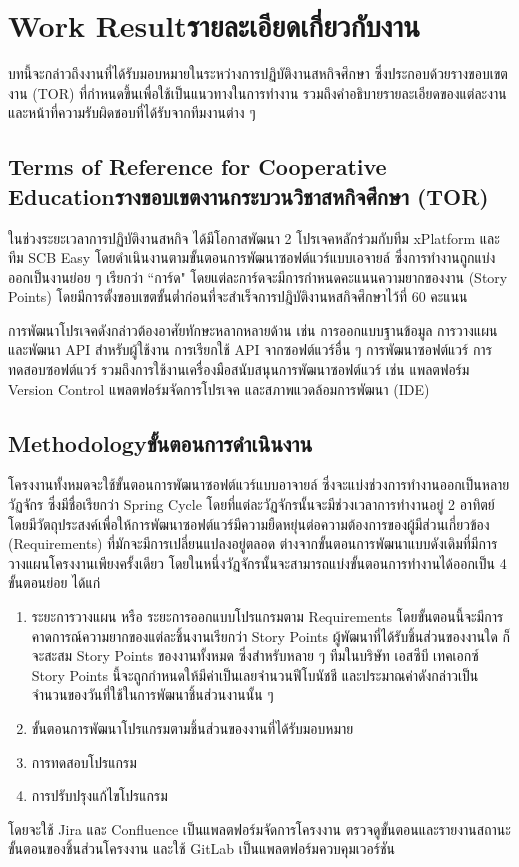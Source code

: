 \chapter{\ifenglish Work Result\else รายละเอียดเกี่ยวกับงาน\fi}
บทนี้จะกล่าวถึงงานที่ได้รับมอบหมายในระหว่างการปฏิบัติงานสหกิจศึกษา ซึ่งประกอบด้วยรางขอบเขตงาน (TOR) ที่กำหนดขึ้นเพื่อใช้เป็นแนวทางในการทำงาน รวมถึงคำอธิบายรายละเอียดของแต่ละงานและหน้าที่ความรับผิดชอบที่ได้รับจากทีมงานต่าง ๆ

\section{\ifenglish Terms of Reference for Cooperative Education\else รางขอบเขตงานกระบวนวิชาสหกิจศึกษา (TOR) \fi}
ในช่วงระยะเวลาการปฏิบัติงานสหกิจ ได้มีโอกาสพัฒนา 2 โปรเจคหลักร่วมกับทีม xPlatform และทีม SCB Easy โดยดำเนินงานตามขั้นตอนการพัฒนาซอฟต์แวร์แบบเอจายล์ ซึ่งการทำงานถูกแบ่งออกเป็นงานย่อย ๆ เรียกว่า ``การ์ด" โดยแต่ละการ์ดจะมีการกำหนดคะแนนความยากของงาน (Story Points) โดยมีการตั้งขอบเขตขั้นต่ำก่อนที่จะสำเร็จการปฎิบัติงานหสกิจศึกษาไว้ที่ 60 คะแนน

การพัฒนาโปรเจคดังกล่าวต้องอาศัยทักษะหลากหลายด้าน เช่น การออกแบบฐานข้อมูล การวางแผนและพัฒนา API สำหรับผู้ใช้งาน การเรียกใช้ API จากซอฟต์แวร์อื่น ๆ การพัฒนาซอฟต์แวร์ การทดสอบซอฟต์แวร์ รวมถึงการใช้งานเครื่องมือสนับสนุนการพัฒนาซอฟต์แวร์ เช่น แพลตฟอร์ม Version Control แพลตฟอร์มจัดการโปรเจค และสภาพแวดล้อมการพัฒนา (IDE)

\section{\ifenglish Methodology\else ขั้นตอนการดำเนินงาน \fi}
โครงงานทั้งหมดจะใช้ขั้นตอนการพัฒนาซอฟต์แวร์แบบอาจายล์ ซึ่งจะแบ่งช่วงการทำงานออกเป็นหลายวัฏจักร ซึ่งมีชื่อเรียกว่า Spring Cycle โดยที่แต่ละวัฏจักรนั้นจะมีช่วงเวลาการทำงานอยู่ 2 อาทิตย์ โดยมีวัตถุประสงค์เพื่อให้การพัฒนาซอฟต์แวร์มีความยืดหยุ่นต่อความต้องการของผู้มีส่วนเกี่ยวข้อง (Requirements) ที่มักจะมีการเปลี่ยนแปลงอยู่ตลอด ต่างจากขั้นตอนการพัฒนาแบบดังเดิมที่มีการวางแผนโครงงานเพียงครั้งเดียว โดยในหนึ่งวัฏจักรนั้นจะสามารถแบ่งขั้นตอนการทำงานได้ออกเป็น 4 ขั้นตอนย่อย ได้แก่
\begin{enumerate}
    \item ระยะการวางแผน หรือ ระยะการออกแบบโปรแกรมตาม Requirements โดยขั้นตอนนี้จะมีการคาดการณ์ความยากของแต่ละชิ้นงานเรียกว่า Story Points ผู้พัฒนาที่ได้รับชิ้นส่วนของงานใด ก็จะสะสม Story Points ของงานทั้งหมด ซึ่งสำหรับหลาย ๆ ทีมในบริษัท เอสซีบี เทคเอกซ์ Story Points นี้จะถูกกำหนดให้มีค่าเป็นเลยจำนวนฟีโบนัชชี และประมาณค่าดังกล่าวเป็นจำนวนของวันที่ใช้ในการพัฒนาชิ้นส่วนงานนั้น ๆ 
    \item ขั้นตอนการพัฒนาโปรแกรมตามชิ้นส่วนของงานที่ได้รับมอบหมาย
    \item การทดสอบโปรแกรม
    \item การปรับปรุงแก้ไขโปรแกรม
\end{enumerate}
โดยจะใช้ Jira และ Confluence เป็นแพลตฟอร์มจัดการโครงงาน ตรวจดูขั้นตอนและรายงานสถานะขั้นตอนของชิ้นส่วนโครงงาน และใช้ GitLab เป็นแพลตฟอร์มควบคุมเวอร์ชัน

